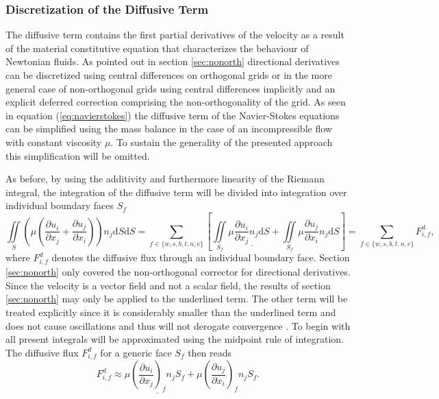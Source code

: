       \subsubsection{Discretization of the Diffusive Term}

      The diffusive term contains the first partial derivatives of the velocity as a result of the material constitutive equation that characterizes the behaviour of Newtonian fluids. As pointed out in section \ref{sec:nonorth} directional derivatives can be discretized using central differences on orthogonal grids or in the more general case of non-orthogonal grids using central differences implicitly and an explicit deferred correction comprising the non-orthogonality of the grid. As seen in equation (\ref{eq:navierstokes}) the diffusive term of the Navier-Stokes equations can be simplified using the mass balance in the case of an incompressible flow with constant viscosity \(\mu\). To sustain the generality of the presented approach this simplification will be omitted.

      As before, by using the additivity and furthermore linearity of the Riemann integral, the integration of the diffusive term will be divided into integration over individual boundary faces \(S_f\) 
      \begin{displaymath}
      \iint\limits_S \left(\mu \left( \frac{\partial u_i}{\partial x_j} + \frac{\partial u_j}{\partial x_i}\right)\right)n_j \mathrm{d}S \mathrm{d}S
      = \sum_{f \in \{w,s,b,t,n,e\}} \left[
        \iint\limits_{S_f} \mu \underline{\frac{\partial u_i}{\partial x_j}n_j \mathrm{d}S}
    + \iint\limits_{S_f} \mu \frac{\partial u_j}{\partial x_i}n_j \mathrm{d}S \right]
       = \sum_{f \in \{w,s,b,t,n,e\}} F_{i,f}^{d},
      \end{displaymath}
      where \(F_{i,f}^{d}\) denotes the diffusive flux through an individual boundary face. Section \ref{sec:nonorth} only covered the non-orthogonal corrector for directional derivatives. Since the velocity is a vector field and not a scalar field, the results of section \ref{sec:nonorth} may only be applied to the underlined term. The other term will be treated explicitly since it is considerably smaller than the underlined term and does not cause oscillations and thus will not derogate convergence \cite{ferziger02}. To begin with all present integrals will be approximated using the midpoint rule of integration. The diffusive flux \(F_{i,f}^d\) for a generic face \(S_f\) then reads 
      \begin{displaymath}
        F_{i,f}^d \approx \mu \underline{\left(\frac{\partial u_i}{\partial x_j}\right)_f n_j S_f} + \mu \left(\frac{\partial u_j}{\partial x_i}\right)_f n_j S_f.
      \end{displaymath}

